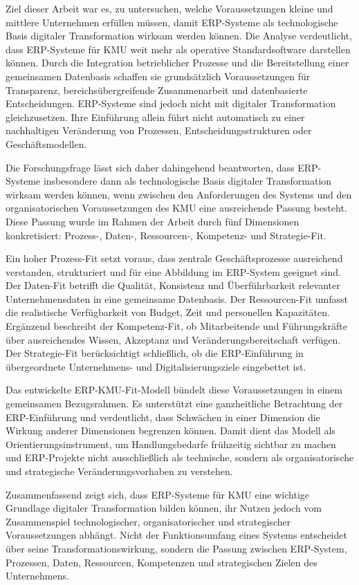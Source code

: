 
Ziel dieser Arbeit war es, zu untersuchen, welche Voraussetzungen kleine und mittlere Unternehmen erfüllen müssen, damit 
ERP-Systeme als technologische Basis digitaler Transformation wirksam werden können. Die Analyse verdeutlicht, dass ERP-Systeme 
für KMU weit mehr als operative Standardsoftware darstellen können. Durch die Integration betrieblicher Prozesse und die 
Bereitstellung einer gemeinsamen Datenbasis schaffen sie grundsätzlich Voraussetzungen für Transparenz, bereichsübergreifende 
Zusammenarbeit und datenbasierte Entscheidungen. ERP-Systeme sind jedoch nicht mit digitaler Transformation gleichzusetzen. 
Ihre Einführung allein führt nicht automatisch zu einer nachhaltigen Veränderung von Prozessen, Entscheidungsstrukturen oder 
Geschäftsmodellen.

Die Forschungsfrage lässt sich daher dahingehend beantworten, dass ERP-Systeme insbesondere dann als technologische Basis 
digitaler Transformation wirksam werden können, wenn zwischen den Anforderungen des Systems und den organisatorischen Voraussetzungen 
des KMU eine ausreichende Passung besteht. Diese Passung wurde im Rahmen der Arbeit durch fünf Dimensionen konkretisiert: 
Prozess-, Daten-, Ressourcen-, Kompetenz- und Strategie-Fit.

Ein hoher Prozess-Fit setzt voraus, dass zentrale Geschäftsprozesse ausreichend verstanden, strukturiert und für eine Abbildung 
im ERP-System geeignet sind. Der Daten-Fit betrifft die Qualität, Konsistenz und Überführbarkeit relevanter Unternehmensdaten in 
eine gemeinsame Datenbasis. Der Ressourcen-Fit umfasst die realistische Verfügbarkeit von Budget, Zeit und personellen Kapazitäten. 
Ergänzend beschreibt der Kompetenz-Fit, ob Mitarbeitende und Führungskräfte über ausreichendes Wissen, Akzeptanz und 
Veränderungsbereitschaft verfügen. Der Strategie-Fit berücksichtigt schließlich, ob die ERP-Einführung in übergeordnete 
Unternehmens- und Digitalisierungsziele eingebettet ist.

Das entwickelte ERP-KMU-Fit-Modell bündelt diese Voraussetzungen in einem gemeinsamen Bezugsrahmen. Es unterstützt eine 
ganzheitliche Betrachtung der ERP-Einführung und verdeutlicht, dass Schwächen in einer Dimension die Wirkung anderer Dimensionen 
begrenzen können. Damit dient das Modell als Orientierungsinstrument, um Handlungsbedarfe frühzeitig sichtbar zu machen und 
ERP-Projekte nicht ausschließlich als technische, sondern als organisatorische und strategische Veränderungsvorhaben zu verstehen.

Zusammenfassend zeigt sich, dass ERP-Systeme für KMU eine wichtige Grundlage digitaler Transformation bilden können, ihr Nutzen 
jedoch vom Zusammenspiel technologischer, organisatorischer und strategischer Voraussetzungen abhängt. Nicht der Funktionsumfang 
eines Systems entscheidet über seine Transformationswirkung, sondern die Passung zwischen ERP-System, Prozessen, Daten, 
Ressourcen, Kompetenzen und strategischen Zielen des Unternehmens.
